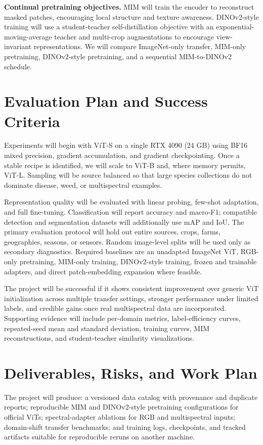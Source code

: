 \documentclass[10pt,twocolumn,letterpaper]{article}
\begin{document}
\textbf{Continual pretraining objectives.} MIM will train the encoder to reconstruct masked patches, encouraging local structure and texture awareness. DINOv2-style training will use a student-teacher self-distillation objective with an exponential-moving-average teacher and multi-crop augmentations to encourage view-invariant representations. We will compare ImageNet-only transfer, MIM-only pretraining, DINOv2-style pretraining, and a sequential MIM-to-DINOv2 schedule.

\section{Evaluation Plan and Success Criteria}
Experiments will begin with ViT-S on a single RTX 4090 (24 GB) using BF16 mixed precision, gradient accumulation, and gradient checkpointing. Once a stable recipe is identified, we will scale to ViT-B and, where memory permits, ViT-L. Sampling will be source balanced so that large species collections do not dominate disease, weed, or multispectral examples.

Representation quality will be evaluated with linear probing, few-shot adaptation, and full fine-tuning. Classification will report accuracy and macro-F1; compatible detection and segmentation datasets will additionally use mAP and IoU. The primary evaluation protocol will hold out entire sources, crops, farms, geographies, seasons, or sensors. Random image-level splits will be used only as secondary diagnostics. Required baselines are an unadapted ImageNet ViT, RGB-only pretraining, MIM-only training, DINOv2-style training, frozen and trainable adapters, and direct patch-embedding expansion where feasible.

The project will be successful if it shows consistent improvement over generic ViT initialization across multiple transfer settings, stronger performance under limited labels, and credible gains once real multispectral data are incorporated. Supporting evidence will include per-domain metrics, label-efficiency curves, repeated-seed mean and standard deviation, training curves, MIM reconstructions, and student-teacher similarity visualizations.

\section{Deliverables, Risks, and Work Plan}
The project will produce: a versioned data catalog with provenance and duplicate reports; reproducible MIM and DINOv2-style pretraining configurations for official ViTs; spectral-adapter ablations for RGB and multispectral inputs; domain-shift transfer benchmarks; and training logs, checkpoints, and tracked artifacts suitable for reproducible reruns on another machine.
\end{document}
